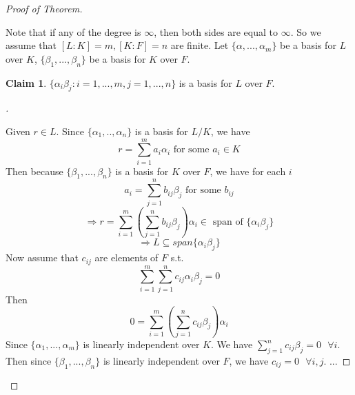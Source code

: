 \documentclass{article}
\newcommand{\sfa}{\text{  } \forall}
\theoremstyle{definition}
\newtheorem*{clm}{Claim}
\newenvironment{proofs}[1][\proofname]{%
  \begin{proof}[#1]$ $\par\nobreak\ignorespaces
}{%
  \end{proof}
}
\begin{document}
\begin{proofs}[Proof of Theorem]
	Note that if any of the degree is $\infty$, then both sides are equal to $\infty$.
	So we assume that $[L:K] = m, [K:F] = n$ are finite. 
	Let $\{\alpha, ..., \alpha_m \}$ be a basis for $L$ over $K$, $\{\beta_1, ..., \beta_n\}$ be a basis for $K$ over $F$.

	\begin{clm}
		$\{\alpha_i \beta_j: i = 1, ..., m, j = 1, ..., n \}$ is a basis for $L$ over $F$.
	\end{clm}

	\begin{proofs}
		Given $r \in L$. 
		Since $\{\alpha_1, .., \alpha_n \}$ is a basis for $L/K$, we have
		\[
			r = \sum_{i = 1}^m a_i \alpha_i \text{ for some } a_i \in K
		\]
		Then because $\{\beta_1, ..., \beta_n\}$ is a basis for $K$ over $F$, we have for each $i$
		\[
			a_i = \sum_{j = 1}^n b_{ij} \beta_j \text{ for some } b_{ij}
		\]
		\[
			\Rightarrow r = \sum_{i = 1}^m (\sum_{j = 1}^n b_{ij} \beta_j) \alpha_i \in \text{ span of } \{\alpha_i \beta_j \}
		\]
		\[
			\Rightarrow L \subseteq span\{\alpha_i \beta_j\}
		\]
		Now assume that $c_{ij}$ are elements of $F$ s.t. 
		\[
			\sum_{i = 1}^m \sum_{j = 1}^n c_{ij} \alpha_i \beta_j = 0
		\]
		Then 
		\[
			0 = \sum_{i = 1}^m (\sum_{j = 1}^n c_{ij} \beta_j) \alpha_i
		\]
		Since $\{\alpha_1, ..., \alpha_m \}$ is linearly independent over $K$. 
		We have $\sum_{j = 1}^n c_{ij} \beta_j = 0 \sfa i$.
		Then since $\{ \beta_1, ..., \beta_n \}$ is linearly independent over $F$, we have $c_{ij} = 0 \sfa i, j$.
		...

	\end{proofs}
\end{proofs}
\end{document}
